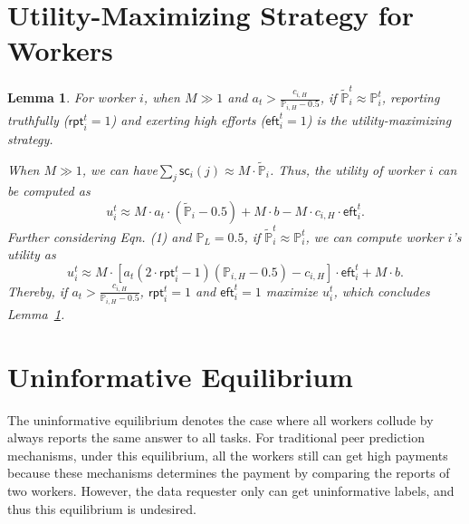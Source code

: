 \documentclass{article}
\makeatletter
\newcounter{lemmas}
\newtheorem{lemma}[lemmas]{Lemma}
\renewenvironment{proof}[1][\proofname]{\par
  \vspace{-\topsep}%
  \pushQED{\qed}%
  \normalfont
  \topsep0pt \partopsep0pt %
  \trivlist
  \item[\hskip\labelsep
        \itshape
    #1\@addpunct{.}]\ignorespaces
}{%
  \popQED\endtrivlist\@endpefalse
  \addvspace{0pt plus 0pt} %
}
\makeatother
\begin{document}
\section{Utility-Maximizing Strategy for Workers}
\begin{lemma}
\label{Strategy}
For worker $i$, when $M\gg 1$ and $a_t>\frac{c_{i, H}}{\mathbb{P}_{i,H}-0.5}$, if $\tilde{\mathbb{P}}^t_i\approx \mathbb{P}^t_i$, reporting truthfully ($\textsf{rpt}^{t}_i=1$) and exerting high efforts ($\textsf{eft}^{t}_i=1$) is the utility-maximizing strategy.
\begin{proof}
When $M\gg 1$, we can have$\sum_j \textsf{sc}_i(j)\approx M\cdot \tilde{\mathbb{P}}_i$. Thus, the utility of worker $i$ can be computed as
\begin{equation}
u_i^t\approx  M\cdot a_t\cdot (\tilde{\mathbb{P}}_i-0.5) + M\cdot b- M \cdot c_{i,H}\cdot \textsf{eft}^{t}_i.
\end{equation}
Further considering Eqn. (1) and $\mathbb{P}_L=0.5$, if $\tilde{\mathbb{P}}^t_i\approx \mathbb{P}^t_i$, we can compute worker $i$'s utility as
\begin{equation}
u_i^t\approx M\cdot [a_t(2\cdot \textsf{rpt}^{t}_i-1)(\mathbb{P}_{i,H}-0.5)-c_{i,H}]\cdot\textsf{eft}^{t}_i+ M\cdot b.
\end{equation}
Thereby, if $a_t>\frac{c_{i,H}}{\mathbb{P}_{i,H}-0.5}$, $\textsf{rpt}^{t}_i=1$ and $\textsf{eft}^{t}_i=1$ maximize $u_i^t$, which concludes Lemma~\ref{Strategy}.
\end{proof}
\end{lemma}

\section{Uninformative Equilibrium}
The uninformative equilibrium denotes the case where all workers collude by always reports the same answer to all tasks.
For traditional peer prediction mechanisms, under this equilibrium, all the workers still can get high payments because these mechanisms determines the payment by comparing the reports of two workers.
However, the data requester only can get uninformative labels, and thus this equilibrium is undesired.
\end{document}
